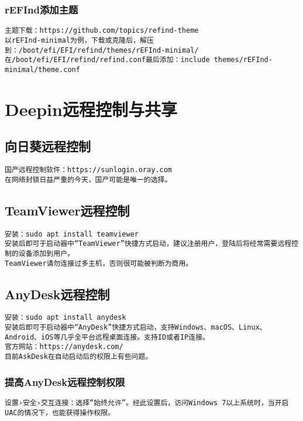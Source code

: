 \documentclass[a4paper,fontset=fandol,zihao=-4,linespread=1.2]{ctexbook}
\begin{document}
\subsection{rEFInd添加主题}
\begin{lstlisting}
主题下载：https://github.com/topics/refind-theme
以rEFInd-minimal为例，下载或克隆后，解压到：/boot/efi/EFI/refind/themes/rEFInd-minimal/
在/boot/efi/EFI/refind/refind.conf最后添加：include themes/rEFInd-minimal/theme.conf
\end{lstlisting}


\chapter{Deepin远程控制与共享}

\section{向日葵远程控制}
\begin{lstlisting}
国产远程控制软件：https://sunlogin.oray.com
在网络封锁日益严重的今天，国产可能是唯一的选择。
\end{lstlisting}

\section{TeamViewer远程控制}
\begin{lstlisting}
安装：sudo apt install teamviewer
安装后即可于启动器中“TeamViewer”快捷方式启动，建议注册用户，登陆后将经常需要远程控制的设备添加到用户。
TeamViewer请勿连接过多主机，否则很可能被判断为商用。
\end{lstlisting}

\section{AnyDesk远程控制}
\begin{lstlisting}
安装：sudo apt install anydesk
安装后即可于启动器中“AnyDesk”快捷方式启动，支持Windows、macOS、Linux、Android、iOS等几乎全平台远程桌面连接。支持ID或者IP连接。
官方网站：https://anydesk.com/
目前AskDesk在自动启动后的权限上有些问题。
\end{lstlisting}

\subsection{提高AnyDesk远程控制权限}
\begin{lstlisting}
设置›安全›交互连接：选择“始终允许”。经此设置后，访问Windows 7以上系统时，当开启UAC的情况下，也能获得操作权限。
\end{lstlisting}
\end{document}
